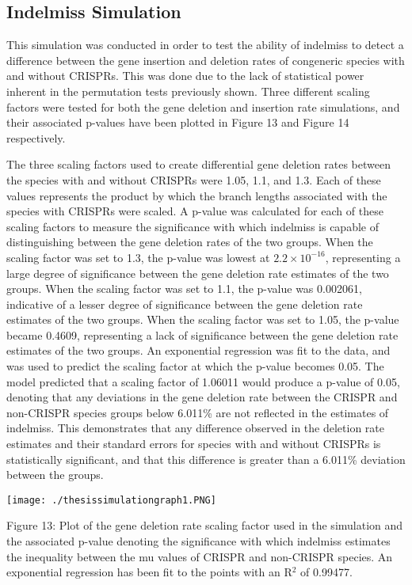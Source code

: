 \documentclass[english]{article}
\begin{document}
\subsection{Indelmiss Simulation}

This simulation was conducted in order to test the ability of
indelmiss to detect a difference between the gene insertion and deletion
rates of congeneric species with and without CRISPRs. This was done
due to the lack of statistical power inherent in the permutation tests previously
shown.  Three
different scaling factors were tested for both the gene deletion and
insertion rate simulations, and their associated p-values have been
plotted in Figure 13 and Figure 14 respectively.

The three scaling factors used to create differential gene deletion
rates between the species with and without CRISPRs were 1.05, 1.1, 
and 1.3. Each of these values
represents the product by which the branch lengths associated with the
species with CRISPRs were scaled.  A p-value was calculated for each
of these scaling factors to measure the significance with which
indelmiss is capable of distinguishing between the gene deletion rates
of the two groups. When the scaling factor was
set to 1.3, the p-value was lowest at $2.2 \times 10^{-16}$,
representing a large degree of significance between the gene deletion
rate estimates of the two groups. When the scaling factor was set to
1.1, the p-value was 0.002061, indicative of a lesser degree of
significance between the gene deletion rate estimates of the two
groups. When the scaling factor was set to 1.05, the p-value became
0.4609, representing a lack of significance between the gene deletion
rate estimates of the two groups. An exponential regression was fit to
the data, and was used to predict the scaling factor at which the
p-value becomes 0.05. The model predicted that a scaling factor of
1.06011 would produce a p-value of 0.05, denoting that any deviations
in the gene deletion rate between the CRISPR and non-CRISPR species
groups below 6.011\% are not reflected in the estimates of indelmiss.
This demonstrates that any difference observed in the deletion rate estimates 
and their standard errors for species with and without CRISPRs is
statistically significant, and that this difference is greater than a
6.011\% deviation between the groups.   

\singlespacing
\texttt{[image: ./thesissimulationgraph1.PNG]}
\caption{Figure 13: Plot of the gene deletion rate scaling factor used
in the simulation and the
associated p-value denoting the significance with which indelmiss
estimates the inequality between the mu values of CRISPR and non-CRISPR 
species. An exponential regression has been fit to the points with an
R$^2$ of 0.99477.}
\singlespacing
\end{document}
